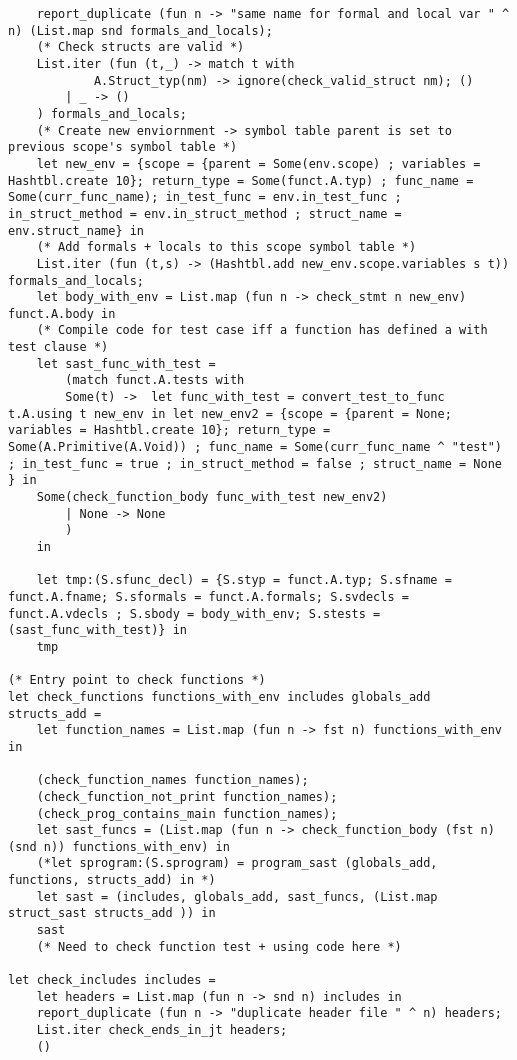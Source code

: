 \documentclass{article}
\begin{document}
\begin{lstlisting}
	report_duplicate (fun n -> "same name for formal and local var " ^ n) (List.map snd formals_and_locals);
	(* Check structs are valid *)
	List.iter (fun (t,_) -> match t with 
			A.Struct_typ(nm) -> ignore(check_valid_struct nm); ()
		| _ -> ()
	) formals_and_locals;
	(* Create new enviornment -> symbol table parent is set to previous scope's symbol table *)
	let new_env = {scope = {parent = Some(env.scope) ; variables = Hashtbl.create 10}; return_type = Some(funct.A.typ) ; func_name = Some(curr_func_name); in_test_func = env.in_test_func ; in_struct_method = env.in_struct_method ; struct_name = env.struct_name} in
	(* Add formals + locals to this scope symbol table *)
	List.iter (fun (t,s) -> (Hashtbl.add new_env.scope.variables s t)) formals_and_locals;
	let body_with_env = List.map (fun n -> check_stmt n new_env) funct.A.body in
	(* Compile code for test case iff a function has defined a with test clause *)
	let sast_func_with_test = 
		(match funct.A.tests with
		Some(t) ->  let func_with_test = convert_test_to_func t.A.using t new_env in let new_env2 = {scope = {parent = None; variables = Hashtbl.create 10}; return_type = Some(A.Primitive(A.Void)) ; func_name = Some(curr_func_name ^ "test") ; in_test_func = true ; in_struct_method = false ; struct_name = None } in
	Some(check_function_body func_with_test new_env2) 
		| None -> None
		)
	in	
		
	let tmp:(S.sfunc_decl) = {S.styp = funct.A.typ; S.sfname = funct.A.fname; S.sformals = funct.A.formals; S.svdecls = funct.A.vdecls ; S.sbody = body_with_env; S.stests = (sast_func_with_test)} in
	tmp

(* Entry point to check functions *)
let check_functions functions_with_env includes globals_add structs_add = 
	let function_names = List.map (fun n -> fst n) functions_with_env in 
	
	(check_function_names function_names); 
	(check_function_not_print function_names); 
	(check_prog_contains_main function_names); 
	let sast_funcs = (List.map (fun n -> check_function_body (fst n) (snd n)) functions_with_env) in
	(*let sprogram:(S.sprogram) = program_sast (globals_add, functions, structs_add) in *)
	let sast = (includes, globals_add, sast_funcs, (List.map struct_sast structs_add )) in
	sast
	(* Need to check function test + using code here *)

let check_includes includes = 
	let headers = List.map (fun n -> snd n) includes in
	report_duplicate (fun n -> "duplicate header file " ^ n) headers;
	List.iter check_ends_in_jt headers;
	()
	


\end{lstlisting}
\end{document}
